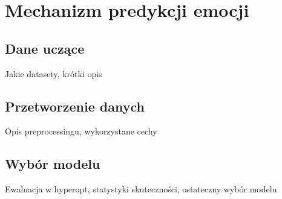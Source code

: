 \chapter{Mechanizm predykcji emocji}
\label{cha:predykcja}
\section{Dane uczące}
Jakie datasety, krótki opis
\section{Przetworzenie danych}
Opis preprocessingu, wykorzystane cechy
\section{Wybór modelu}
Ewaluacja w hyperopt, statystyki skuteczności, ostateczny wybór modelu